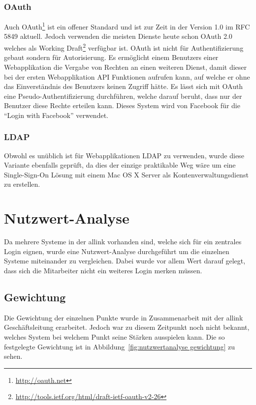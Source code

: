 \subsubsection{OAuth}
\label{ssub:OAuth}
Auch OAuth\footnote{\url{http://oauth.net}} ist ein offener Standard und ist zur Zeit in der Version 1.0 im RFC 5849\cite{rfc5849} aktuell. Jedoch verwenden die meisten Dienste heute schon OAuth 2.0 welches als Working Draft\footnote{\url{http://tools.ietf.org/html/draft-ietf-oauth-v2-26}} verfügbar ist. OAuth ist nicht für Authentifizierung gebaut sondern für Autorisierung. Es ermöglicht einem Benutzers einer Webapplikation die Vergabe von Rechten an einen weiteren Dienst, damit dieser bei der ersten Webapplikation API Funktionen aufrufen kann, auf welche er ohne das Einverständnis des Benutzers keinen Zugriff hätte. Es lässt sich mit OAuth eine Pseudo-Authentifizierung durchführen, welche darauf beruht, dass nur der Benutzer diese Rechte erteilen kann. Dieses System wird von Facebook für die ``Login with Facebook'' verwendet.

\subsubsection{LDAP}
\label{ssub:LDAP}
Obwohl es unüblich ist für Webapplikationen LDAP\cite{rfc4511} zu verwenden, wurde diese Variante ebenfalls geprüft, da dies der einzige praktikable Weg wäre um eine Single-Sign-On Lösung mit einem Mac OS X Server als Kontenverwaltungsdienst zu erstellen.

\section{Nutzwert-Analyse}
\label{sec:Nutzwert-Analyse}
Da mehrere Systeme in der allink vorhanden sind, welche sich für ein zentrales Login eignen, wurde eine Nutzwert-Analyse durchgeführt um die einzelnen Systeme miteinander zu vergleichen. Dabei wurde vor allem Wert darauf gelegt, dass sich die Mitarbeiter nicht ein weiteres Login merken müssen.

\subsection{Gewichtung}
\label{sub:Gewichtung}
Die Gewichtung der einzelnen Punkte wurde in Zusammenarbeit mit der allink Geschäftsleitung erarbeitet. Jedoch war zu diesem Zeitpunkt noch nicht bekannt, welches System bei welchem Punkt seine Stärken ausspielen kann. Die so festgelegte Gewichtung ist in Abbildung~\ref{fig:nutzwertanalyse gewichtung} zu sehen.

